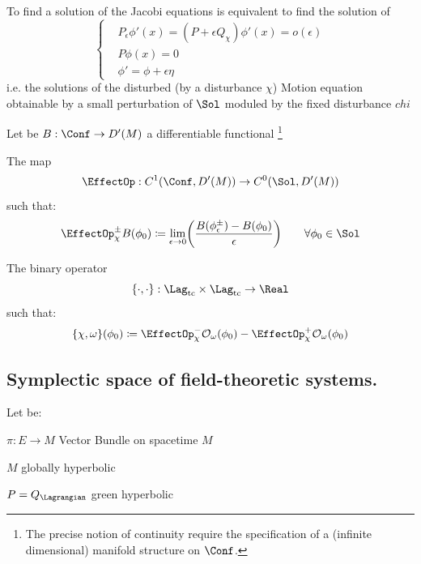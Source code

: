 \documentclass[a4paper,11pt]{scrartcl}
\begin{document}
	\begin{proposition}
		To find a solution of the Jacobi equations is equivalent to find the solution of 
   			\begin{displaymath}
   			   	\begin{cases} 
  					& P_\epsilon \phi'(x) = (P + \epsilon Q_\chi ) \phi'(x) = o(\epsilon)  \\ 
					& P \phi(x) = 0 \\
					& \phi' = \phi + \epsilon \eta
				\end{cases} 			
   			\end{displaymath}		
		i.e. the solutions of the disturbed (by a disturbance $\chi$) Motion equation obtainable by a small perturbation of $\Sol$ moduled by the fixed disturbance $chi$
	\end{proposition}	
	Let be $B:\Conf \rightarrow D'(M)$ a differentiable functional \footnote{The precise notion of continuity require the specification of a (infinite dimensional) manifold structure on $\Conf$.}
	\begin{definition}
		The map
		$$\EffectOp : C^1(\Conf,D'(M)) \rightarrow C^0(\Sol,D'(M))$$
		such that:
		$$	\EffectOp_\chi^\pm B ( \phi_0) \coloneqq \lim_{\epsilon \rightarrow 0} \biggr( \frac{B(\phi_\epsilon^\pm) - B (\phi_0)}{\epsilon} \biggr)  \qquad \forall \phi_0 \in \Sol $$
	\end{definition}
	\begin{definition}
 		The binary operator
		$$ \{\cdot,\cdot\}:\Lag_{\textrm{tc}} \times \Lag_{\textrm{tc}} \rightarrow \Real 	$$
		such that:
		$$ \{\chi, \omega \}(\phi_0) \coloneqq \EffectOp_\chi^- \mathcal{O}_\omega (\phi_0) - \EffectOp_\chi^+ \mathcal{O}_\omega(\phi_0) $$
	\end{definition}
	
	
	\subsection*{Symplectic space of field-theoretic systems.}
	Let be:
	\begin{compactitemize}
		\item $\pi : E \rightarrow M $ Vector Bundle on spacetime $M$
		\item $M$  globally hyperbolic
		\item $P= Q_\Lagrangian$ green hyperbolic
	\end{compactitemize}
	
\end{document}
